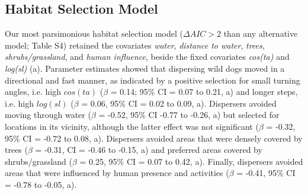 \documentclass[abstract=on,10pt,a4paper,bibliography=totocnumbered]{article}
\begin{document}
\subsection{Habitat Selection Model}
Our most parsimonious habitat selection model (\(\Delta AIC > 2\) than any
alternative model; Table S4) retained the covariates \textit{water},
\textit{distance to water}, \textit{trees}, \textit{shrubs/grassland}, and
\textit{human influence}, beside the fixed covariates \textit{cos(ta)} and
\textit{log(sl)} (a). Parameter estimates showed that
dispersing wild dogs moved in a directional and fast manner, as indicated by a
positive selection for small turning angles, i.e. high \(cos(ta)\) (\(\beta\) =
0.14; 95\% CI = 0.07 to 0.21, a) and longer steps,
i.e. high \(log(sl)\) (\(\beta\) = 0.06, 95\% CI = 0.02 to 0.09,
a). Dispersers avoided moving through water (\(\beta\)
= -0.52, 95\% CI -0.77 to -0.26, a) but selected for
locations in its vicinity, although the latter effect was not significant
(\(\beta\) = -0.32, 95\% CI = -0.72 to 0.08, a).
Dispersers avoided areas that were densely covered by trees (\(\beta\) = -0.31,
CI = -0.46 to -0.15, a) and preferred areas covered by
shrubs/grassland (\(\beta\) = 0.25, 95\% CI = 0.07 to 0.42,
a). Finally, dispersers avoided areas that were
influenced by human presence and activities (\(\beta\) = -0.41, 95\% CI = -0.78
to -0.05, a).
\end{document}
